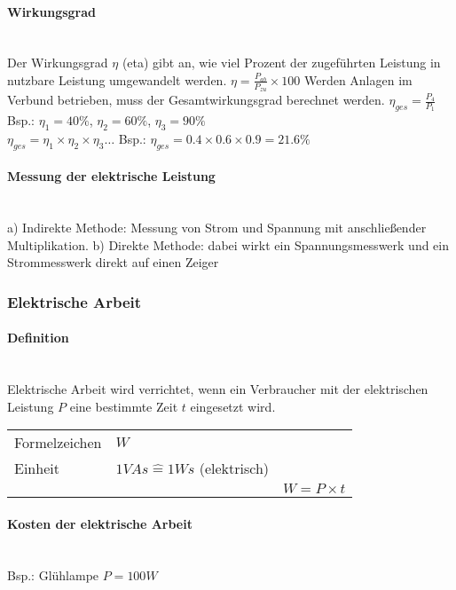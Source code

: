 \paragraph{Wirkungsgrad}~\\
Der Wirkungsgrad $\eta$ (eta) gibt an, wie viel Prozent der zugeführten Leistung in nutzbare Leistung umgewandelt werden. $\eta = \frac{P_{ab}}{P_{zu}}\times 100$
Werden Anlagen im Verbund betrieben, muss der Gesamtwirkungsgrad berechnet werden.
$\eta_{ges} = \frac{P_4}{P_1}$\\
Bsp.: $\eta_1 = 40\%$, $\eta_2 = 60\%$, $\eta_3 = 90\%$\\
$\eta_{ges} = \eta_1\times\eta_2\times\eta_3\dots$
Bsp.: $\eta_{ges} = 0.4\times0.6\times0.9 = 21.6\%$

\paragraph{Messung der elektrische Leistung}~\\
a) Indirekte Methode: Messung von Strom und Spannung mit anschließender Multiplikation. b) Direkte Methode: dabei wirkt ein Spannungsmesswerk und ein Strommesswerk direkt auf einen Zeiger

\subsubsection{Elektrische Arbeit}

\paragraph{Definition}~\\
Elektrische Arbeit wird verrichtet, wenn ein Verbraucher mit der elektrischen Leistung $P$ eine bestimmte Zeit $t$ eingesetzt wird.\\
\begin{tabular}{lll}
Formelzeichen & $W$ &\\
Einheit & $1VAs \widehat{=} 1Ws$ (elektrisch) &\\
& & $W = P\times t$\\
\end{tabular}

\paragraph{Kosten der elektrische Arbeit}~\\
Bsp.: Glühlampe $P = 100W$
\begin{tabular}{lll}

\end{tabular}

